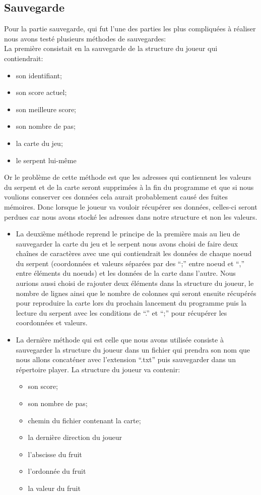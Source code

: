 \documentclass{article}
\begin{document}
\subsection{Sauvegarde}
Pour la partie sauvegarde, qui fut l’une des parties les plus compliquées à réaliser nous avons testé plusieurs méthodes de sauvegardes:\\[0.5cm]
La première consistait en la sauvegarde de la structure du joueur qui contiendrait:
\begin{itemize}
    \item son identifiant;
    \item son score actuel;
    \item son meilleure score;
    \item son nombre de pas;
    \item la carte du jeu;
    \item le serpent lui-même
\end{itemize}
Or le problème de cette méthode est que les adresses qui contiennent les valeurs du serpent et de la carte seront supprimées à la fin du programme et que si nous voulions conserver ces données cela aurait probablement causé des fuites mémoires. Donc lorsque le joueur va vouloir récupérer ses données, celles-ci seront perdues car nous avons stocké les adresses dans notre structure et non les valeurs.\\[0.5cm]
\begin{itemize}
    \item La deuxième méthode reprend le principe de la première mais au lieu de sauvegarder la carte du jeu et le serpent nous avons choisi de faire deux chaînes de caractères avec une qui contiendrait les données de chaque noeud du serpent (coordonnées et valeurs séparées par des “;” entre noeud et “,” entre éléments du noeuds) et les données de la carte dans l’autre. Nous aurions aussi choisi de rajouter deux éléments dans la structure du joueur, le nombre de lignes ainsi que le nombre de colonnes qui seront ensuite récupérés pour reproduire la carte lors du prochain lancement du programme puis la lecture du serpent avec les conditions de “.” et “;” pour récupérer les coordonnées et valeurs.\\[0.5cm]
    \item La dernière méthode qui est celle que nous avons utilisée consiste à sauvegarder la structure du joueur dans un fichier qui prendra son nom que nous allons concaténer avec l’extension “.txt” puis sauvegarder dans un répertoire player. La structure du joueur va contenir:
    \begin{itemize}
        \item son score;
        \item son nombre de pas;
        \item chemin du fichier contenant la carte;
        \item la dernière direction du joueur
        \item l’abscisse du fruit
        \item l’ordonnée du fruit
        \item la valeur du fruit
    \end{itemize}
\end{itemize}
\end{document}
